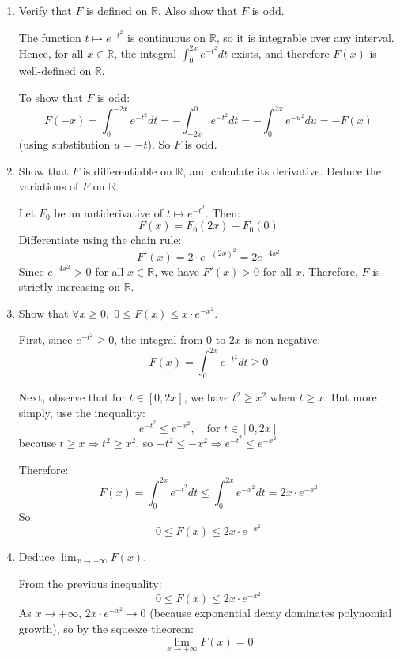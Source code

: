 \documentclass[12pt]{article}
\begin{document}
\begin{answerbox}
  \begin{enumerate}
    \item Verify that $ F $ is defined on $ \mathbb{R} $. Also show that $ F $ is odd.

    The function $ t \mapsto e^{-t^2} $ is continuous on $ \mathbb{R} $, so it is integrable over any interval. Hence, for all $ x \in \mathbb{R} $, the integral $ \int_0^{2x} e^{-t^2} dt $ exists, and therefore $ F(x) $ is well-defined on $ \mathbb{R} $.

    To show that $ F $ is odd:
    $$
    F(-x) = \int_0^{-2x} e^{-t^2} dt = -\int_{-2x}^0 e^{-t^2} dt = -\int_0^{2x} e^{-u^2} du = -F(x)
    $$
    (using substitution $ u = -t $). So $ F $ is odd.

    \item Show that $ F $ is differentiable on $ \mathbb{R} $, and calculate its derivative. Deduce the variations of $ F $ on $ \mathbb{R} $.

    Let $ F_0 $ be an antiderivative of $ t \mapsto e^{-t^2} $. Then:
    $$
    F(x) = F_0(2x) - F_0(0)
    $$
    Differentiate using the chain rule:
    $$
    F'(x) = 2 \cdot e^{-(2x)^2} = 2e^{-4x^2}
    $$
    Since $ e^{-4x^2} > 0 $ for all $ x \in \mathbb{R} $, we have $ F'(x) > 0 $ for all $ x $. Therefore, $ F $ is strictly increasing on $ \mathbb{R} $.

    \item Show that $ \forall x \geq 0, \; 0 \leq F(x) \leq x \cdot e^{-x^2} $.

    First, since $ e^{-t^2} \geq 0 $, the integral from 0 to $ 2x $ is non-negative:
    $$
    F(x) = \int_0^{2x} e^{-t^2} dt \geq 0
    $$

    Next, observe that for $ t \in [0, 2x] $, we have $ t^2 \geq x^2 $ when $ t \geq x $. But more simply, use the inequality:
    $$
    e^{-t^2} \leq e^{-x^2}, \quad \text{for } t \in [0, 2x]
    $$
    because $ t \geq x \Rightarrow t^2 \geq x^2 $, so $ -t^2 \leq -x^2 \Rightarrow e^{-t^2} \leq e^{-x^2} $

    Therefore:
    $$
    F(x) = \int_0^{2x} e^{-t^2} dt \leq \int_0^{2x} e^{-x^2} dt = 2x \cdot e^{-x^2}
    $$
    So:
    $$
    0 \leq F(x) \leq 2x \cdot e^{-x^2}
    $$

    \item Deduce $ \lim_{x \to +\infty} F(x) $.

    From the previous inequality:
    $$
    0 \leq F(x) \leq 2x \cdot e^{-x^2}
    $$
    As $ x \to +\infty $, $ 2x \cdot e^{-x^2} \to 0 $ (because exponential decay dominates polynomial growth), so by the squeeze theorem:
    $$
    \lim_{x \to +\infty} F(x) = 0
    $$


\end{enumerate}
\end{answerbox}
\end{document}
